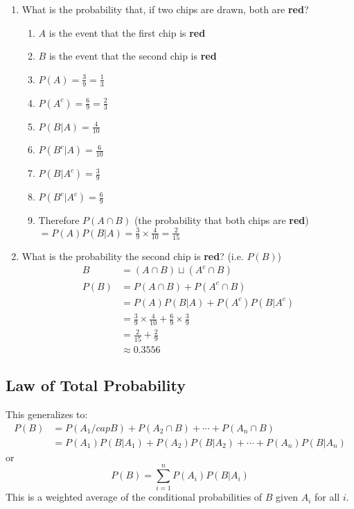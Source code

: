 \documentclass[12pt]{article}
\begin{document}
\begin{enumerate}
                \item What is the probability that, if two chips are drawn, both are \textbf{red}?
                \begin{enumerate}
                    \item $A$ is the event that the first chip is \textbf{red}
                    \item $B$ is the event that the second chip is \textbf{red}
                    \item $P(A) = \frac{3}{9} = \frac{1}{3}$
                    \item $P(A^c) = \frac{6}{9} = \frac{2}{3}$
                    \item $P(B|A) = \frac{4}{10}$
                    \item $P(B^c|A) = \frac{6}{10}$
                    \item $P(B|A^c) = \frac{3}{9}$
                    \item $P(B^c|A^c) = \frac{6}{9}$
                    \item Therefore $P(A \cap B)$ (the probability that both chips are \textbf{red}) $= P(A)P(B|A) = \frac{3}{9}\times\frac{4}{10} = \frac{2}{15}$
                \end{enumerate}
                \item What is the probability the second chip is \textbf{red}? (i.e. $P(B)$)
                \begin{align*}
                    B &= (A \cap B) \sqcup (A^c \cap B)\\
                    P(B) &= P(A \cap B) + P(A^c \cap B)\\
                    &= P(A)P(B|A) + P(A^c)P(B|A^c)\\
                    &= \frac{3}{9}\times\frac{4}{10} + \frac{6}{9}\times\frac{3}{9}\\
                    &= \frac{2}{15} + \frac{2}{9}\\
                    &\approx 0.3556
                \end{align*}
            \end{enumerate}
        \subsection{Law of Total Probability}
            This generalizes to:
            \begin{align*}
                P(B) &= P(A_1 /cap B) + P(A_2 \cap B) + \cdots + P(A_n \cap B)\\
                &= P(A_1)P(B|A_1) + P(A_2)P(B|A_2) + \cdots + P(A_n)P(B|A_n)
            \end{align*}
            or
            \begin{equation}
                P(B) = \sum_{i=1}^n P(A_i)P(B|A_i)
            \end{equation}
            This is a weighted average of the conditional probabilities of $B$ given $A_i$ for all $i$.
\end{document}
